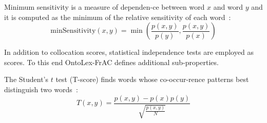 \begin{definition} 
Minimum sensitivity is a measure of dependen-ce between word $x$ and word $y$ and it is computed as 
the minimum of the relative sensitivity of each word~\citep{pedersen1998dependent}:
\[\text{minSensitivity}(x,y)=\min\left(\frac{p(x,y)}{p(y)}, \frac{p(x, y)}{p(x)}\right)\]
\end{definition}

\noindent In addition to collocation scores, statistical independence tests are employed as scores. To this end OntoLex-FrAC defines additional sub-properties.





\begin{definition}
The Student's $t$ test (T-score) finds words whose co-occur-rence patterns best distinguish %
two words~\citep{Manning1999}:
\[T(x,y) = \frac{ p(x,y) - p(x)p(y) }{\sqrt{\frac{ p(x, y) }{ N }}}\]
\end{definition}


%

